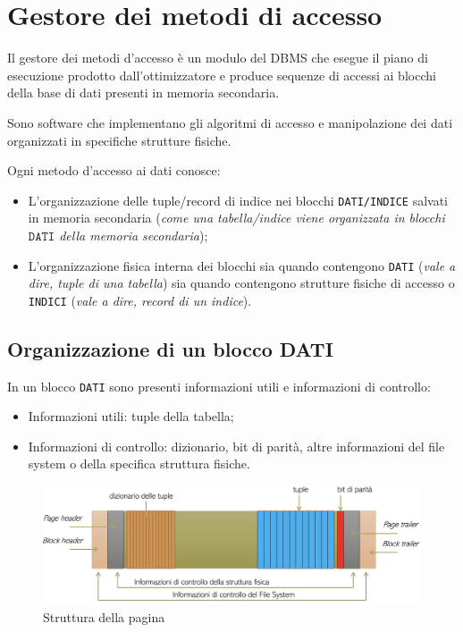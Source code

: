 \documentclass[oneside,a4paper,11pt]{book}
\theoremstyle{italicstyle}
\theoremstyle{normStyle}
\begin{document}
\section{Gestore dei metodi di accesso}
Il gestore dei metodi d'accesso è un modulo del DBMS che esegue il piano di esecuzione 
prodotto dall'ottimizzatore e produce sequenze di accessi ai blocchi della base di dati 
presenti in memoria secondaria.
\begin{tcolorbox}[title={Metodi d'accesso}]
Sono software che implementano gli algoritmi di accesso e manipolazione dei dati 
organizzati in specifiche strutture fisiche.
\end{tcolorbox}
Ogni metodo d'accesso ai dati conosce:
\begin{itemize}
    \item L'organizzazione delle tuple/record di indice nei blocchi \verb|DATI/INDICE| salvati
    in memoria secondaria (\textit{come una tabella/indice viene organizzata 
    in blocchi $\texttt{DATI}$ della memoria secondaria});
    \item L’organizzazione fisica interna dei blocchi sia quando contengono \verb|DATI| 
    (\textit{vale a dire, tuple di una tabella}) sia quando contengono strutture 
    fisiche di accesso o \verb|INDICI| (\textit{vale a dire, record di un indice}).
\end{itemize}
\subsection{Organizzazione di un blocco DATI}
In un blocco \verb|DATI| sono presenti informazioni utili e informazioni di controllo:
\begin{itemize}
    \item Informazioni utili: tuple della tabella;
    \item Informazioni di controllo: dizionario, bit di parità, altre informazioni del 
    file system o della specifica struttura fisiche.
\end{itemize}
\begin{figure}[H]
    \centering
    \includegraphics[width=15cm]{img/Tabella_livello_fisico.png}
    \caption{Struttura della pagina}
    \label{fig:pagina_struttura}
\end{figure}
\end{document}
